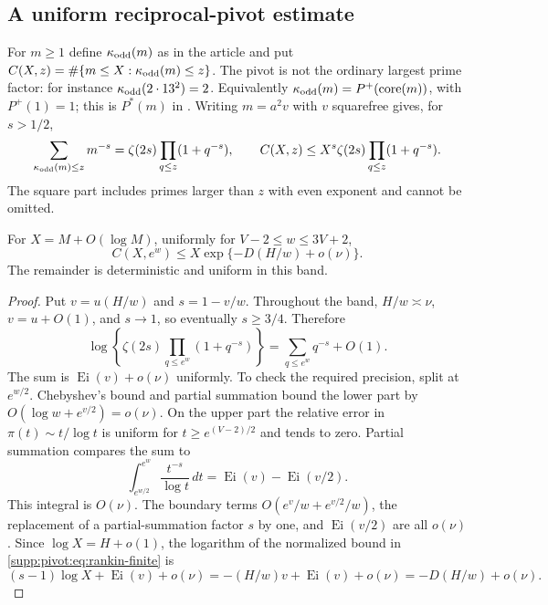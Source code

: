 \subsection{A uniform reciprocal-pivot estimate}
For $m\ge1$ define $\kappa_{\rm odd}(m)$ as in the article and put
$C(X,z)=\#\{m\le X:\kappa_{\rm odd}(m)\le z\}$.
The pivot is not the ordinary largest prime factor: for instance
$\kappa_{\rm odd}(2\cdot13^2)=2$.
Equivalently $\kappa_{\rm odd}(m)=P^+(\operatorname{core}(m))$,
with $P^+(1)=1$; this is $P^*(m)$ in
\cite[eq.~(5)]{deLaBretecheWangXu2026}.
Writing $m=a^2v$ with $v$ squarefree gives, for $s>1/2$,
\begin{equation}\label{supp:pivot:eq:rankin-finite}
 \sum_{\kappa_{\rm odd}(m)\le z}m^{-s}
   =\zeta(2s)\prod_{q\le z}(1+q^{-s}),\qquad
 C(X,z)\le X^s\zeta(2s)\prod_{q\le z}(1+q^{-s}).
\end{equation}
The square part includes primes larger than $z$ with even exponent and cannot be omitted.

\begin{lemma}\label{supp:pivot:lem:rankin}
For $X=M+O(\log M)$, uniformly for $V-2\le w\le3V+2$,
\begin{equation}\label{supp:pivot:eq:rankin}
 C(X,e^w)\le X\exp\{-D(H/w)+o(\nu)\}.
\end{equation}
The remainder is deterministic and uniform in this band.
\end{lemma}
\begin{proof}
Put $v=u(H/w)$ and $s=1-v/w$. Throughout the band,
$H/w\asymp\nu$, $v=u+O(1)$, and $s\to1$, so eventually $s\ge3/4$.
Therefore
\[
 \log\left\{\zeta(2s)\prod_{q\le e^w}(1+q^{-s})\right\}
    =\sum_{q\le e^w}q^{-s}+O(1).
\]
The sum is $\operatorname{Ei}(v)+o(\nu)$ uniformly. To check the required precision, split at $e^{w/2}$. Chebyshev's bound and partial summation bound the lower part by $O(\log w+e^{v/2})=o(\nu)$.
On the upper part the relative error in $\pi(t)\sim t/\log t$ is uniform for $t\ge e^{(V-2)/2}$ and tends to zero. Partial summation compares the sum to
\[
 \int_{e^{w/2}}^{e^w}\frac{t^{-s}}{\log t}\,dt
       =\operatorname{Ei}(v)-\operatorname{Ei}(v/2).
\]
This integral is $O(\nu)$. The boundary terms
$O(e^v/w+e^{v/2}/w)$, the replacement of a partial-summation factor $s$ by one, and $\operatorname{Ei}(v/2)$ are all $o(\nu)$.
Since $\log X=H+o(1)$, the logarithm of the normalized bound in
\eqref{supp:pivot:eq:rankin-finite} is
\[
 (s-1)\log X+\operatorname{Ei}(v)+o(\nu)
   =-(H/w)v+\operatorname{Ei}(v)+o(\nu)
   =-D(H/w)+o(\nu).
\]
\end{proof}

